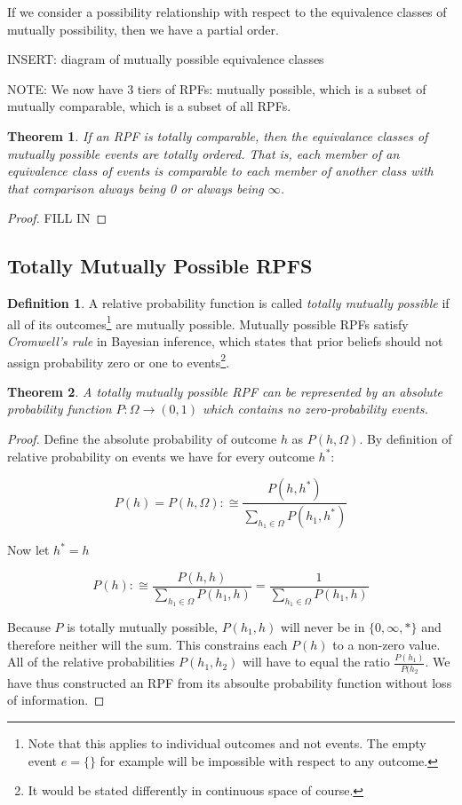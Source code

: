 \documentclass[twoside]{article}
\theoremstyle{plain}%
\newtheorem{theorem}{Theorem}[section]
\theoremstyle{definition}
\newtheorem{definition}{Definition}[section]
\theoremstyle{remark}
\begin{document}
If we consider a possibility relationship with respect to the equivalence classes of mutually possibility, then we have a partial order.

INSERT: diagram of mutually possible equivalence classes

NOTE: We now have 3 tiers of RPFs: mutually possible, which is a subset of mutually comparable, which is a subset of all RPFs.

\begin{theorem}
If an RPF is totally comparable, then the equivalance classes of mutually possible events are \textit{totally ordered}. That is, each member of an equivalence class of events is comparable to each member of another class with that comparison always being 0 or always being \(\infty\).
\end{theorem}

\begin{proof}
FILL IN
\end{proof}

\subsection{Totally Mutually Possible RPFS}

\begin{definition}
A relative probability function is called \textit{totally mutually possible} if all of its outcomes\footnote{Note that this applies to individual outcomes and not events. The empty event \(e = \{\}\) for example will be impossible with respect to any outcome.\cite{theorem:empty_event_impossible}} are mutually possible. Mutually possible RPFs satisfy \textit{Cromwell's rule} in Bayesian inference, which states that prior beliefs should not assign probability zero or one to events\footnote{It would be stated differently in continuous space of course.}.
\end{definition}

\begin{theorem}
A totally mutually possible RPF can be represented by an absolute probability function \(P: \Omega \rightarrow (0, 1)\) which contains no zero-probability events.
\end{theorem}

\begin{proof}
Define the absolute probability of outcome \(h\) as \(P(h, \Omega)\). By definition of relative probability on events we have for every outcome \(h^*\):

\[P(h)=P(h, \Omega):\cong \frac{P(h, h^*)}{\sum_{h_1 \in \Omega} P(h_1, h^*)}\]

Now let \(h^* = h\)

\[P(h):\cong \frac{P(h, h)}{\sum_{h_1 \in \Omega} P(h_1, h)}=\frac{1}{\sum_{h_1 \in \Omega} P(h_1, h)}\]

Because \(P\) is totally mutually possible, \(P(h_1, h)\) will never be in \(\{0, \infty, \ast\}\) and therefore neither will the sum. This constrains each \(P(h)\) to a non-zero value. All of the relative probabilities \(P(h_1, h_2)\) will have to equal the ratio \(\frac{P(h_1)}{P(h_2}\). We have thus constructed an RPF from its absoulte probability function without loss of information.
\end{proof}
\end{document}
